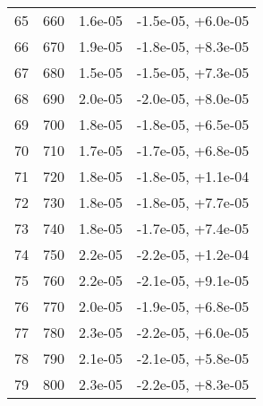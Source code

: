 \begin{table}
\begin{adjustbox}{width=1\textwidth/2}
\begin{tabular}{|c|c|c|c|}
\cline{1-4}
65 & 660 & 1.6e-05 & -1.5e-05, +6.0e-05 \\
\cline{1-4}
66 & 670 & 1.9e-05 & -1.8e-05, +8.3e-05 \\
\cline{1-4}
67 & 680 & 1.5e-05 & -1.5e-05, +7.3e-05 \\
\cline{1-4}
68 & 690 & 2.0e-05 & -2.0e-05, +8.0e-05 \\
\cline{1-4}
69 & 700 & 1.8e-05 & -1.8e-05, +6.5e-05 \\
\cline{1-4}
70 & 710 & 1.7e-05 & -1.7e-05, +6.8e-05 \\
\cline{1-4}
71 & 720 & 1.8e-05 & -1.8e-05, +1.1e-04 \\
\cline{1-4}
72 & 730 & 1.8e-05 & -1.8e-05, +7.7e-05 \\
\cline{1-4}
73 & 740 & 1.8e-05 & -1.7e-05, +7.4e-05 \\
\cline{1-4}
74 & 750 & 2.2e-05 & -2.2e-05, +1.2e-04 \\
\cline{1-4}
75 & 760 & 2.2e-05 & -2.1e-05, +9.1e-05 \\
\cline{1-4}
76 & 770 & 2.0e-05 & -1.9e-05, +6.8e-05 \\
\cline{1-4}
77 & 780 & 2.3e-05 & -2.2e-05, +6.0e-05 \\
\cline{1-4}
78 & 790 & 2.1e-05 & -2.1e-05, +5.8e-05 \\
\cline{1-4}
79 & 800 & 2.3e-05 & -2.2e-05, +8.3e-05 \\
\cline{1-4}
\end{tabular}
\end{adjustbox}
\end{table}

